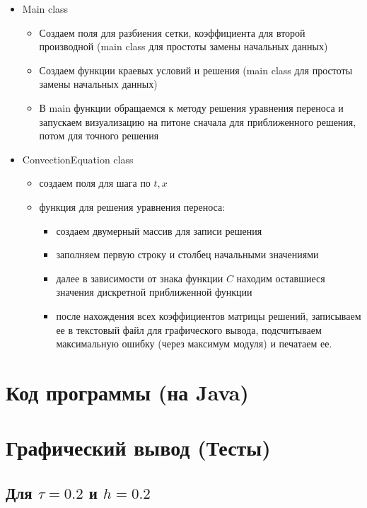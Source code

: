 \documentclass[12pt,a4paper]{scrartcl}
\begin{document}
\begin{itemize}
		\item Main class 
		\begin{itemize}
			\item Создаем поля для разбиения сетки, коэффициента для
			второй производной (main class для простоты замены начальных
			данных)
			\item Создаем функции краевых условий и решения (main class
			для простоты замены начальных данных)
			\item В main функции обращаемся к методу решения уравнения переноса и запускаем визуализацию на питоне сначала для приближенного решения, потом для точного решения
		\end{itemize}
		\item{ConvectionEquation class}
		\begin{itemize}
			\item создаем поля для шага по $t,x$  
			\item функция для решения уравнения переноса:
			\begin{itemize}
				\item создаем двумерный массив для записи решения 
				\item заполняем первую строку и столбец начальными значениями
				\item далее в зависимости от знака функции $C$ находим оставшиеся значения дискретной приближенной функции
				\item после нахождения всех коэффициентов матрицы решений, записываем ее в текстовый файл для графического вывода, подсчитываем максимальную ошибку (через максимум модуля) и печатаем ее.
			\end{itemize}
		\end{itemize}
\end{itemize}

\section{Код программы (на Java)}



\section{Графический вывод (Тесты)}
\subsection{Для $\tau = 0.2$ и $h = 0.2$}
\end{document}
